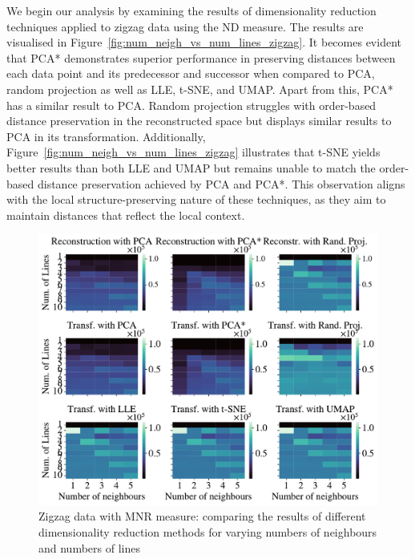 \documentclass[pdftex,12pt,a4paper]{report}
\begin{document}
We begin our analysis by examining the results of dimensionality reduction techniques applied to zigzag data using the ND measure.
The results are visualised in Figure~\ref{fig:num_neigh_vs_num_lines_zigzag}.
It becomes evident that PCA* demonstrates superior performance in preserving distances between each data point and its predecessor and successor when compared to PCA, random projection as well as LLE, t-SNE, and UMAP.
Apart from this, PCA* has a similar result to PCA.
Random projection struggles with order-based distance preservation in the reconstructed space but displays similar results to PCA in its transformation.
Additionally, Figure~\ref{fig:num_neigh_vs_num_lines_zigzag} illustrates that t-SNE yields better results than both LLE and UMAP but remains unable to match the order-based distance preservation achieved by PCA and PCA*. 
This observation aligns with the local structure-preserving nature of these techniques, as they aim to maintain distances that reflect the local context.


\begin{figure}[htb!]
    \includegraphics[width=\textwidth]{./images/multiple_runs/zigzag/num_lines_vs_num_neigh/multiple_scalar_product/all_methods_10runs_10lines_100points_5neighbours.pdf}
    \caption{Zigzag data with MNR measure: comparing the results of different dimensionality reduction methods for varying numbers of neighbours and numbers of lines}\label{fig:num_neigh_vs_num_lines_zigzag_scal}
\end{figure}
\end{document}
